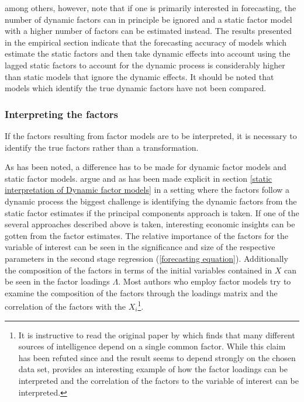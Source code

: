 \documentclass[12pt]{article}
\begin{document}
\citet{breitung2011testing} among others, however, note that if one is primarily interested in forecasting, the number of dynamic factors can in principle be ignored and a static factor model with a higher number of factors can be estimated instead. The results presented in the empirical section indicate that the forecasting accuracy of models which estimate the static factors and then take dynamic effects into account using the lagged static factors to account for the dynamic process is considerably higher than static models that ignore the dynamic effects. It should be noted that models which identify the true dynamic factors have not been compared.

\subsubsection{Interpreting the factors}
If the factors resulting from factor models are to be interpreted, it is necessary to identify the true factors rather than a transformation. 

As has been noted, a difference has to be made for dynamic factor models and static factor models. \citet{breitung2004identification} argue and as has been made explicit in section \ref{static interpretation of Dynamic factor models} in a setting where the factors follow a dynamic process the biggest challenge is identifying the dynamic factors from the static factor estimates if the principal components approach is taken. If one of the several approaches described above is taken, interesting economic insights can be gotten from the factor estimates. The relative importance of the factors for the variable of interest can be seen in the significance and size of the respective parameters in the second stage regression (\ref{forecasting equation}). Additionally the composition of the factors in terms of the initial variables contained in $X$ can be seen in the factor loadings $\Lambda$. Most authors who employ factor models try to examine the composition of the factors through the loadings matrix and the correlation of the factors with the $X_i$\footnote{It is instructive to read the original paper by \citet{spearman1904general} which finds that many different sources of intelligence depend on a single common factor. While this claim has been refuted since and the result seems to depend strongly on the chosen data set, \citet{spearman1904general} provides an interesting example of how the factor loadings can be interpreted and the correlation of the factors to the variable of interest can be interpreted.}.
\end{document}
